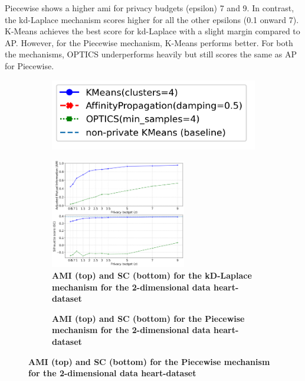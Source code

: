 Piecewise shows a higher \gls{ami} for privacy budgets (epsilon) 7 and 9. In contrast, the kd-Laplace mechanism scores higher for all the other epsilons (0.1 onward 7).
K-Means achieves the best score for kd-Laplace with a slight margin compared to AP.
However, for the Piecewise mechanism, K-Means performs better.
For both the mechanisms, OPTICS underperforms heavily but still scores the same as AP for Piecewise.
\newpage
\begin{figure}[H]
    \centering
    \begin{subfigure}{0.3\textwidth}
        \includegraphics[width=\textwidth]{Results/2d-laplace/heart-dataset/legend.png}
    \end{subfigure}
    \begin{subfigure}{1\textwidth}
        \caption{\textbf{AMI (top) and SC (bottom) for the kD-Laplace mechanism for the 2-dimensional data heart-dataset}}
        \centering
        \includegraphics[width=0.65\textwidth]{Results/kd-laplace/kd-Laplace/heart-dataset/ami-and-sc_2_dimensions.png}
        \centering
    \end{subfigure}
    \begin{subfigure}{1\textwidth}
        \caption{\textbf{AMI (top) and SC (bottom) for the Piecewise mechanism for the 2-dimensional data heart-dataset}}

\end{subfigure}
\end{figure}
